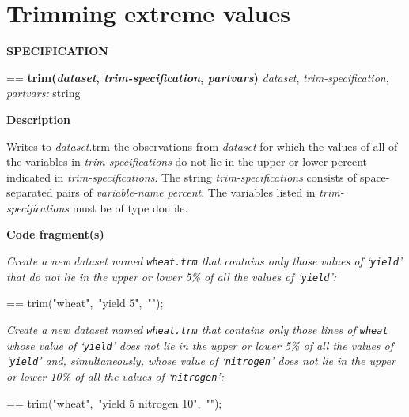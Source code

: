 \documentclass{book}
\makeatletter
\newcommand\Texinfocommandstyletextvar[1]{{\normalfont{}\textsl{#1}}}%
\newenvironment{Texinfopreformatted}{%
  \par\GNUTobeylines\obeyspaces\frenchspacing\parskip=\z@\parindent=\z@}{}
{\catcode`\^^M=13 \gdef\GNUTobeylines{\catcode`\^^M=13 \def^^M{\null\par}}}
\newenvironment{Texinfoindented}{\begin{list}{}{}\item\relax}{\end{list}}
\renewcommand{\_}{\Texinfounderscore\discretionary{}{}{}}
\makeatother
\begin{document}
\section{{Trimming extreme values}}
\label{anchor:Trimming-extreme-values}%

\noindent{}\textbf{SPECIFICATION}
\begin{Texinfoindented}
\begin{Texinfopreformatted}%
\textbf{trim(\Texinfocommandstyletextvar{dataset}, \Texinfocommandstyletextvar{trim-specification}, \Texinfocommandstyletextvar{partvars})}
\Texinfocommandstyletextvar{dataset}, \Texinfocommandstyletextvar{trim-specification}, \Texinfocommandstyletextvar{partvars:} string
\end{Texinfopreformatted}
\end{Texinfoindented}

\noindent{}\textbf{Description}

Writes to \Texinfocommandstyletextvar{dataset}.trm the observations from \Texinfocommandstyletextvar{dataset}
for which the values of all of the variables in
\Texinfocommandstyletextvar{trim-specifications} do not lie in the upper or lower percent indicated in
\Texinfocommandstyletextvar{trim-specifications}.
The string \Texinfocommandstyletextvar{trim-specifications}
consists of space-separated pairs of
\Texinfocommandstyletextvar{variable-name} \Texinfocommandstyletextvar{percent}.
The variables listed in \Texinfocommandstyletextvar{trim-specifications} must be of type double.

\noindent{}\textbf{Code fragment(s)}

\emph{Create a new dataset named \texttt{wheat.trm} that contains only
those values of `\texttt{yield}' that do not lie
in the upper or lower 5\% of all the values of `\texttt{yield}':}
\begin{Texinfoindented}
\begin{Texinfopreformatted}%
\ttfamily trim("wheat",\ "yield 5",\ "");
\end{Texinfopreformatted}
\end{Texinfoindented}

\emph{Create a new dataset named \texttt{wheat.trm} that contains only
those lines of \texttt{wheat} whose value of `\texttt{yield}' does not lie
in the upper or lower 5\% of all the values of `\texttt{yield}' and,
simultaneously, whose value of `\texttt{nitrogen}' does not lie
in the upper or lower 10\% of all the values of `\texttt{nitrogen}':}
\begin{Texinfoindented}
\begin{Texinfopreformatted}%
\ttfamily trim("wheat",\ "yield 5 nitrogen 10",\ "");
\end{Texinfopreformatted}
\end{Texinfoindented}
%
%
%
%
\end{document}
